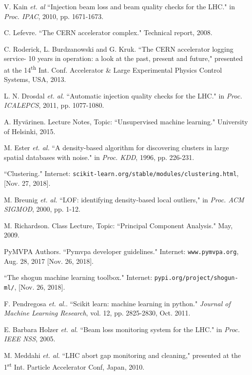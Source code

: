 \documentclass[12pt, twoside]{report}
\begin{document}
	\begin{thebibliography}{12}
		V. Kain \textit{et. al} ``Injection beam loss and beam quality checks for the LHC." in \textit{Proc. IPAC}, 2010, pp. 1671-1673.
		
		C. Lefevre. ``The CERN accelerator complex." Technical report, 2008.
		
		C. Roderick, L. Burdzanowski and G. Kruk. ``The CERN accelerator logging service- 10 years in operation: a look at the past, present and future," presented at the 14\textsuperscript{th} Int. Conf. Accelerator \& Large Experimental Physics Control Systems, USA, 2013.
		
		L. N. Drosdal \textit{et. al.} ``Automatic injection quality checks for the LHC." in \textit{Proc. ICALEPCS}, 2011, pp. 1077-1080.
		
		
		A. Hyv{\"a}rinen. Lecture Notes, Topic: ``Unsupervised machine learning." University of Helsinki, 2015.
		
		
		M. Ester \textit{et. al.} ``A density-based algorithm for discovering clusters in large spatial databases with noise." in \textit{Proc. KDD}, 1996, pp. 226-231.
		
		``Clustering." Internet: \texttt{scikit-learn.org/stable/modules/clustering.html}, [Nov. 27, 2018].
		
		M. Breunig \textit{et. al.} ``LOF: identifying density-based local outliers," in \textit{Proc. ACM SIGMOD}, 2000, pp. 1-12.
		
		M. Richardson. Class Lecture, Topic: ``Principal Component Analysis." May, 2009.
		
		PyMVPA Authors. ``Pymvpa developer guidelines." Internet: \texttt{www.pymvpa.org}, Aug. 28, 2017 [Nov. 26, 2018].
		
		``The shogun machine learning toolbox." Internet: \texttt{pypi.org/project/shogun-ml/}, [Nov. 26, 2018].
		
		F. Pendregosa \textit{et. al.}. ``Scikit learn: machine learning in python." \textit{Journal of Machine Learning Research}, vol. 12, pp. 2825-2830, Oct. 2011.
		
		E. Barbara Holzer \textit{et. al.} ``Beam loss monitoring system for the LHC." in \textit{Proc. IEEE NSS}, 2005. 
		
		M. Meddahi \textit{et. al.} ``LHC abort gap monitoring and cleaning," presented at the 1\textsuperscript{st} Int. Particle Accelerator Conf, Japan, 2010.   
	\end{thebibliography}
\end{document}
